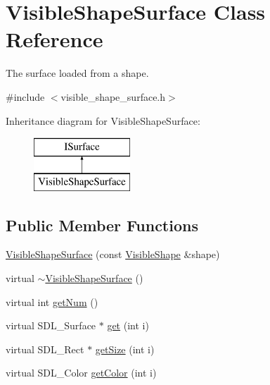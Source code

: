\hypertarget{class_visible_shape_surface}{}\section{Visible\+Shape\+Surface Class Reference}
\label{class_visible_shape_surface}


The surface loaded from a shape.  




{\ttfamily \#include $<$visible\+\_\+shape\+\_\+surface.\+h$>$}

Inheritance diagram for Visible\+Shape\+Surface\+:\begin{figure}[H]
\begin{center}
\leavevmode
\includegraphics[height=2.000000cm]{class_visible_shape_surface}
\end{center}
\end{figure}
\subsection*{Public Member Functions}
\begin{DoxyCompactItemize}
\item 
\mbox{\hyperlink{class_visible_shape_surface_a6ee7d8b8d3e77bce2305085c42cccde9}{Visible\+Shape\+Surface}} (const \mbox{\hyperlink{class_visible_shape}{Visible\+Shape}} \&shape)
\item 
virtual \mbox{\hyperlink{class_visible_shape_surface_a5fd68bb1de0c3b37d54a22201f443fa3}{$\sim$\+Visible\+Shape\+Surface}} ()
\item 
virtual int \mbox{\hyperlink{class_visible_shape_surface_af516dd80787f73eb853800b9ac33a8d5}{get\+Num}} ()
\item 
virtual S\+D\+L\+\_\+\+Surface $\ast$ \mbox{\hyperlink{class_visible_shape_surface_a200885c58c30916f61eebdb6c179030d}{get}} (int i)
\item 
virtual S\+D\+L\+\_\+\+Rect $\ast$ \mbox{\hyperlink{class_visible_shape_surface_abc5e37a573511089f2cc42169fb89812}{get\+Size}} (int i)
\item 
virtual S\+D\+L\+\_\+\+Color \mbox{\hyperlink{class_visible_shape_surface_a4ffd8c178ae0e39059422ec86bed2034}{get\+Color}} (int i)
\end{DoxyCompactItemize}


